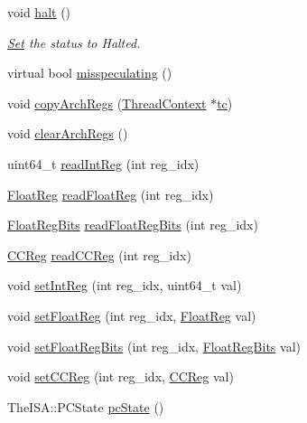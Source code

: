 \begin{DoxyCompactItemize}
void \hyperlink{classSimpleThread_ade0430439247877006d7df950f94918a}{halt} ()
\begin{DoxyCompactList}\small\item\em \hyperlink{classSet}{Set} the status to Halted. \item\end{DoxyCompactList}\item 
virtual bool \hyperlink{classSimpleThread_a99768639c728ee835cce54b8b42b3d8f}{misspeculating} ()
\item 
void \hyperlink{classSimpleThread_a01b372f805c92c90e6148b76d23d6236}{copyArchRegs} (\hyperlink{classThreadContext}{ThreadContext} $\ast$\hyperlink{classSimpleThread_a922168dc0855a866d2ed033338c1ca27}{tc})
\item 
void \hyperlink{classSimpleThread_ad5c88ea41846742bd8c70d9c50f31945}{clearArchRegs} ()
\item 
uint64\_\-t \hyperlink{classSimpleThread_a21c850cd41ab977a2cf3450fe66ec25a}{readIntReg} (int reg\_\-idx)
\item 
\hyperlink{classSimpleThread_a75484259f1855aabc8d74c6eb1cfe186}{FloatReg} \hyperlink{classSimpleThread_a2f97d83baef4fbda00b7f7f62779752f}{readFloatReg} (int reg\_\-idx)
\item 
\hyperlink{classSimpleThread_aab5eeae86499f9bfe15ef79360eccc64}{FloatRegBits} \hyperlink{classSimpleThread_a4998e6615f835676762af364eff198e3}{readFloatRegBits} (int reg\_\-idx)
\item 
\hyperlink{classSimpleThread_a0c9de550a32808e6a25b54b6c791d5ab}{CCReg} \hyperlink{classSimpleThread_ac3d147c535052bfb1f8e8fe0697168d7}{readCCReg} (int reg\_\-idx)
\item 
void \hyperlink{classSimpleThread_abc264e8ee37c6bd7d7b5759b97c34356}{setIntReg} (int reg\_\-idx, uint64\_\-t val)
\item 
void \hyperlink{classSimpleThread_ab6fd8e55b81c173f448ec0c42bc28b99}{setFloatReg} (int reg\_\-idx, \hyperlink{classSimpleThread_a75484259f1855aabc8d74c6eb1cfe186}{FloatReg} val)
\item 
void \hyperlink{classSimpleThread_a618651078f08ecd328dfe3312f0f2ea7}{setFloatRegBits} (int reg\_\-idx, \hyperlink{classSimpleThread_aab5eeae86499f9bfe15ef79360eccc64}{FloatRegBits} val)
\item 
void \hyperlink{classSimpleThread_afd6c42b1888ad21a4382078ca7a86d09}{setCCReg} (int reg\_\-idx, \hyperlink{classSimpleThread_a0c9de550a32808e6a25b54b6c791d5ab}{CCReg} val)
\item 
TheISA::PCState \hyperlink{classSimpleThread_a827fb3454585cf4c620f4fd341966317}{pcState} ()

\end{DoxyCompactItemize}
